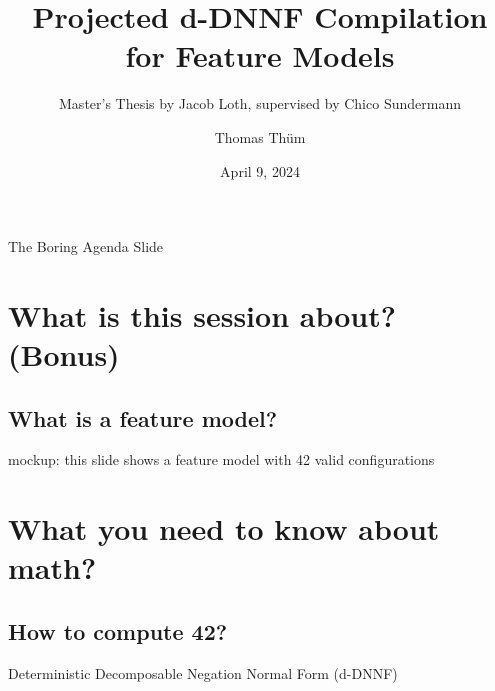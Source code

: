 \documentclass[
	aspectratio=169, %
	8pt, %
]{beamer}
\title{Projected d-DNNF Compilation for Feature Models} %
\subtitle[A Master's Thesis]{Master's Thesis by Jacob Loth, supervised by Chico Sundermann} %
\author{Thomas Thüm} %
\date{April 9, 2024} %
\begin{document}
	
\contentoverview[2]

\maketitle[image7] %

\begin{frame}{The Boring Agenda Slide}
		\begin{fancycolumns}[t,columns=3,animation=keep,reverse]
		\setlength{\parskip}{.5ex}\tableofcontents[sections={1}]
		\nextcolumn
		\setlength{\parskip}{.5ex}\tableofcontents[sections={2}]
		\nextcolumn
		\setlength{\parskip}{.5ex}\tableofcontents[sections={3}]
	\end{fancycolumns}
\end{frame}

\section{What is this session about? (Bonus)}

\subsection{What is a feature model?}
\begin{frame}{\insertsubsection}
	mockup: this slide shows a feature model with 42 valid configurations
\end{frame}

\section{What you need to know about math?}

\subsection{How to compute 42?}
\begin{frame}{\insertsubsection\hfill{}\normalsize{}Deterministic Decomposable Negation Normal Form (d-DNNF)}
	\begin{fancycolumns}[animation=none]
		\centering{}
	\nextcolumn
	\end{fancycolumns}
\end{frame}
\end{document}
